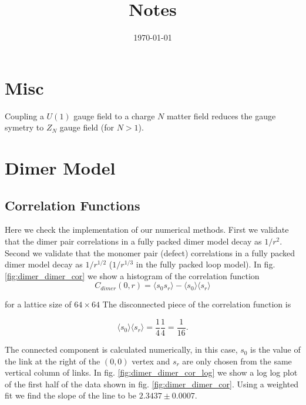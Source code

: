 \documentclass[aps,floatfix,11pt]{revtex4-1}
\begin{document}
\title{Notes}

\date{\today}

\begin{abstract}
    
\end{abstract}

\maketitle 

\section{Misc}
Coupling a $U(1)$ gauge field to a charge $N$ matter field reduces the gauge symetry to $Z_N$ gauge
field (for $N>1$).

\section{Dimer Model}

\subsection{Correlation Functions}

Here we check the implementation of our numerical methods. First we validate that the dimer pair
correlations in a fully packed dimer model decay as $1/r^2$. Second we validate that the monomer
pair (defect) correlations in a fully packed dimer model decay as $1/r^{1/2}$ ($1/r^{1/3}$ in the
fully packed loop model). In fig. \ref{fig:dimer_dimer_cor} we show a histogram of the correlation
function 
\begin{equation}
    \label{}
    C_{dimer}(0,r) = \langle s_0 s_r \rangle -\langle s_0 \rangle \langle s_r \rangle
\end{equation}

\noindent
for a lattice size of $64\times 64$ The disconnected piece of the correlation function is

\begin{equation}
    \label{}
    \langle s_0 \rangle \langle s_r \rangle = \frac{1}{4}\frac{1}{4} = \frac{1}{16}.
\end{equation}

\noindent
The connected component is calculated numerically, in this case, $s_0$ is the value of the link at the
right of the $(0,0)$ vertex and $s_r$ are only chosen from the same vertical column of links.
In fig. \ref{fig:dimer_dimer_cor_log} we show a log log plot of the first half of the data
shown in fig. \ref{fig:dimer_dimer_cor}. Using a weighted fit we find the slope of the line to be
$2.3437\pm 0.0007$.
\end{document}
